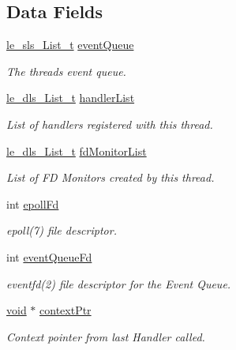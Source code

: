 \subsection*{Data Fields}
\begin{DoxyCompactItemize}
\item 
\hyperlink{structle__sls___list__t}{le\+\_\+sls\+\_\+\+List\+\_\+t} \hyperlink{structevent___per_thread_rec__t_a12ca21b869f113ea2ab7536c439d98fb}{event\+Queue}
\begin{DoxyCompactList}\small\item\em The thread\textquotesingle{}s event queue. \end{DoxyCompactList}\item 
\hyperlink{structle__dls___list__t}{le\+\_\+dls\+\_\+\+List\+\_\+t} \hyperlink{structevent___per_thread_rec__t_aaa495d6cf8b48b83815db112898c4cd9}{handler\+List}
\begin{DoxyCompactList}\small\item\em List of handlers registered with this thread. \end{DoxyCompactList}\item 
\hyperlink{structle__dls___list__t}{le\+\_\+dls\+\_\+\+List\+\_\+t} \hyperlink{structevent___per_thread_rec__t_a07268bec73747d8d6c2ef9178260b256}{fd\+Monitor\+List}
\begin{DoxyCompactList}\small\item\em List of FD Monitors created by this thread. \end{DoxyCompactList}\item 
int \hyperlink{structevent___per_thread_rec__t_a509a7372744a3aede12c2e97d02ff8ad}{epoll\+Fd}
\begin{DoxyCompactList}\small\item\em epoll(7) file descriptor. \end{DoxyCompactList}\item 
int \hyperlink{structevent___per_thread_rec__t_ae0c369b884f17da9b57276cf7b446e4c}{event\+Queue\+Fd}
\begin{DoxyCompactList}\small\item\em eventfd(2) file descriptor for the Event Queue. \end{DoxyCompactList}\item 
\hyperlink{_t_e_m_p_l_a_t_e__cdef_8h_ac9c84fa68bbad002983e35ce3663c686}{void} $\ast$ \hyperlink{structevent___per_thread_rec__t_a2fdc816618fb28f6cddfa191d9339e7b}{context\+Ptr}
\begin{DoxyCompactList}\small\item\em Context pointer from last Handler called. \end{DoxyCompactList}\item 

\end{DoxyCompactItemize}
